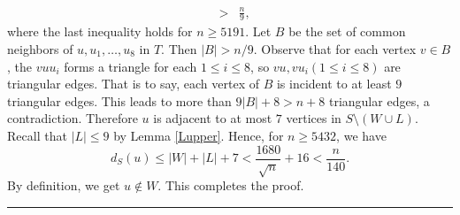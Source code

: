 \documentclass[10pt,a4paper]{amsart}
\newenvironment{proof}{\noindent {\bf Proof.}}{\rule{2mm}{2mm}\par\medskip}
\begin{document}
\begin{proof}
\begin{eqnarray*}
 &>&\frac{n}{9}, 
\end{eqnarray*}
 where the last inequality holds for $n\ge 5191$.  
Let $B$ be the set of common neighbors of $u,u_1,\ldots ,u_8$ in $T$. 
Then $|B|>n/9$. 
Observe that for each vertex $v\in B$, the $vuu_i$ forms a triangle 
for each $1\le i\le 8$, so $vu,vu_i (1\le i \le 8)$ are triangular edges. That is to say, each vertex of $B$ 
is incident to at least $9$ triangular edges. 
This leads to more than $9|B| +8 > n +8$ triangular edges, a contradiction.
Therefore $u$ is adjacent to at most $7$ vertices in  $S\setminus (W\cup L)$. 
Recall that $|L|\le 9$ by Lemma \ref{Lupper}.  
Hence, for $n\ge 5432$, we have 
\[  d_S(u) \le |W|+|L|+ 7 
<  \frac{1680}{\sqrt{n}} + 16 < \frac{n}{140}. \] 
By definition, we get $u\notin W$.
This completes the proof. 
 \end{proof}
\end{document}
